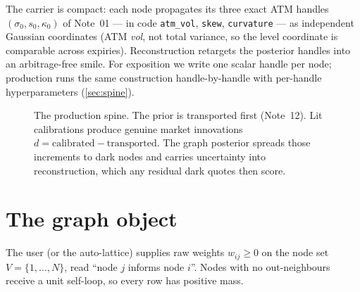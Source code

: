 \documentclass[11pt]{article}
\begin{document}
The carrier is compact: each node propagates its three exact ATM handles
$(\sigma_0,s_0,\kappa_0)$ of Note~01 --- in code \texttt{atm\_vol},
\texttt{skew}, \texttt{curvature} --- as independent Gaussian coordinates (ATM
\emph{vol}, not total variance, so the level coordinate is comparable across
expiries). Reconstruction retargets the posterior handles into an arbitrage-free
smile. For exposition we write one scalar handle per node; production runs the
same construction handle-by-handle with per-handle hyperparameters
(\cref{sec:spine}).

\begin{figure}[H]
\centering
{}
\caption{The production spine. The prior is transported first (Note~12). Lit
calibrations produce genuine market innovations
$d=\text{calibrated}-\text{transported}$. The graph posterior spreads those
increments to dark nodes and carries uncertainty into reconstruction, which any
residual dark quotes then score.}
\label{fig:spine}
\end{figure}

\section{The graph object}
\label{sec:graph}

\begin{assumption}
\label{ass:weights}
The user (or the auto-lattice) supplies raw weights $w_{ij}\ge0$ on the node set
$V=\{1,\dots,N\}$, read ``node $j$ informs node $i$''. Nodes with no
out-neighbours receive a unit self-loop, so every row has positive mass.
\end{assumption}
\end{document}
